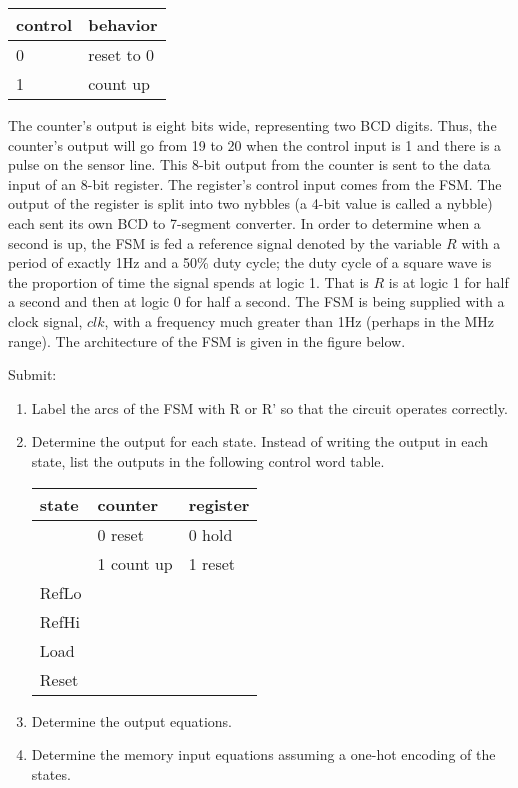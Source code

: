 \begin{enumerate}
\begin{tabular}{l|l}
control & behavior \\ \hline \hline
0	& reset to 0 \\ \hline
1	& count up \\
\end{tabular}

The counter's output is eight bits wide, representing two BCD digits.  Thus,
the counter's output will go from 19 to 20 when the control input is 1
and there is a pulse on the sensor line.  This 8-bit output from the
counter is sent to the data input of an 8-bit register.  The register's
control input comes from the FSM.  The output of the register is split
into two nybbles (a 4-bit value is called a nybble)
each sent its own BCD to 7-segment converter.  In order to determine
when a second is up, the FSM is fed a reference signal denoted by 
the variable $R$ with a period of exactly 1Hz and a 50\% duty cycle; 
the duty cycle of a square wave is the proportion of time the signal 
spends at logic 1.   That is $R$ is at logic 1 for half a second and 
then at logic 0 for half a second.  The FSM is being supplied with a 
clock signal, $clk$, with a frequency much greater than 1Hz (perhaps 
in the MHz range).  The architecture of the FSM is given in 
the figure below.  


Submit:
\begin{enumerate}
\item Label the arcs of the FSM with R or R' so that the
 circuit operates correctly.
\item Determine the output for each state.  Instead of writing the
output in each state, list the outputs in the following control
word table.

\begin{tabular}{l||l|l}
state	& counter	& register \\ \hline 
    & 0 reset	& 0 hold \\ \hline
    & 1 count up& 1 reset \\ \hline \hline
RefLo	&		&	  \\ \hline
RefHi	&		&	  \\ \hline
Load 	&		&	  \\ \hline
Reset	&		&	  \\ 
\end{tabular}

\item Determine the output equations.
\item Determine the memory input equations assuming a one-hot
encoding of the states.
\end{enumerate}



\end{enumerate}
